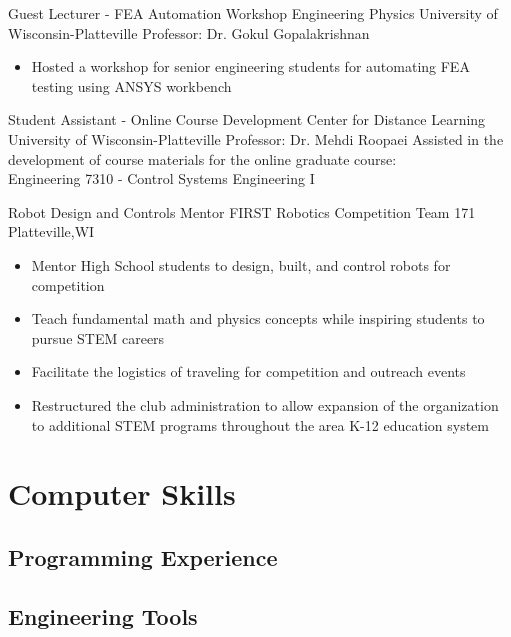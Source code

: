 \documentclass[11pt,letterpaper,roman]{moderncv} %
\begin{document}
{Guest Lecturer - FEA Automation Workshop}
{Engineering Physics}
{University of Wisconsin-Platteville}
{Professor: Dr. Gokul Gopalakrishnan}
{\begin{itemize}
    \item Hosted a workshop for senior engineering students for automating FEA testing using ANSYS workbench
\end{itemize}
}

{Student Assistant - Online Course Development}
{Center for Distance Learning}
{University of Wisconsin-Platteville}
{Professor: Dr. Mehdi Roopaei}
{Assisted in the development of course materials for the online graduate course:\\ Engineering 7310 - Control Systems Engineering I}


{Robot Design and Controls Mentor}
{FIRST Robotics Competition Team 171}
{Platteville,WI}{}{
\begin{itemize}
    \item Mentor High School students to design, built, and control robots for competition
    \item Teach fundamental math and physics concepts while inspiring students to pursue STEM careers
    \item Facilitate the logistics of traveling for competition and outreach events
    \item Restructured the club administration to allow expansion of the organization to additional STEM programs throughout the area K-12 education system
\end{itemize}
}

\section{Computer Skills}

\subsection{\textbf{Programming Experience}}

\subsection{\textbf{Engineering Tools}}
\end{document}
